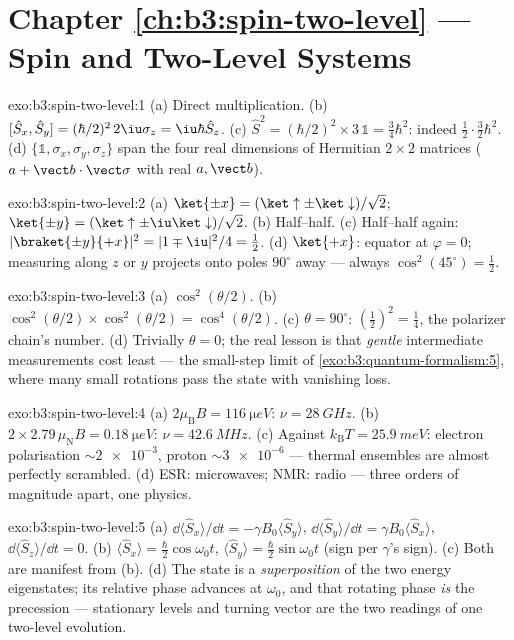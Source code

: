 \section*{Chapter \ref{ch:b3:spin-two-level} --- Spin and Two-Level Systems}

\begin{solution}{exo:b3:spin-two-level:1}
(a) Direct multiplication. (b) $[\hat S_x, \hat S_y] =
(\hbar/2)^2\,2\iu\sigma_z = \iu\hbar\hat S_z$. (c) $\hat S^2 =
(\hbar/2)^2 \times 3\,\mathbb 1 = \tfrac34\hbar^2$: indeed
$\tfrac12\cdot\tfrac32\hbar^2$. (d) $\{\mathbb 1, \sigma_x,
\sigma_y, \sigma_z\}$ span the four real dimensions of Hermitian
$2\times2$ matrices ($a + \vect b\cdot\vect\sigma$ with real $a,
\vect b$).
\end{solution}

\begin{solution}{exo:b3:spin-two-level:2}
(a) $\ket{\pm x} = (\ket\uparrow \pm \ket\downarrow)/\sqrt2$;
$\ket{\pm y} = (\ket\uparrow \pm \iu\ket\downarrow)/\sqrt2$. (b)
Half--half. (c) Half--half again: $|\braket{\pm y}{+x}|^2 =
|1 \mp \iu|^2/4 = \tfrac12$. (d) $\ket{+x}$: equator at $\varphi =
0$; measuring along $z$ or $y$ projects onto poles $90^\circ$ away
--- always $\cos^2(45^\circ) = \tfrac12$.
\end{solution}

\begin{solution}{exo:b3:spin-two-level:3}
(a) $\cos^2(\theta/2)$. (b) $\cos^2(\theta/2) \times
\cos^2(\theta/2) = \cos^4(\theta/2)$. (c) $\theta = 90^\circ$:
$(\tfrac12)^2 = \tfrac14$, the polarizer chain's number. (d)
Trivially $\theta = 0$; the real lesson is that \emph{gentle}
intermediate measurements cost least --- the small-step limit of
\cref{exo:b3:quantum-formalism:5}, where many small rotations pass
the state with vanishing loss.
\end{solution}

\begin{solution}{exo:b3:spin-two-level:4}
(a) $2\mu_{\text{B}}B = \qty{116}{\micro eV}$: $\nu =
\qty{28}{GHz}$. (b) $2 \times 2.79\,\mu_{\text{N}}B =
\qty{0.18}{\micro eV}$: $\nu = \qty{42.6}{MHz}$. (c) Against
$k_{\text{B}}T = \qty{25.9}{meV}$: electron polarisation
$\sim\num{2e-3}$, proton $\sim\num{3e-6}$ --- thermal 
ensembles are almost perfectly scrambled. (d) ESR: microwaves;
NMR: radio --- three orders of magnitude apart, one physics.
\end{solution}

\begin{solution}{exo:b3:spin-two-level:5}
(a) $\dd\langle\hat S_x\rangle/\dd t = -\gamma B_0\langle\hat
S_y\rangle$, $\dd\langle\hat S_y\rangle/\dd t = \gamma
B_0\langle\hat S_x\rangle$, $\dd\langle\hat S_z\rangle/\dd t = 0$.
(b) $\langle\hat S_x\rangle = \tfrac\hbar2\cos\omega_0t$,
$\langle\hat S_y\rangle = \tfrac\hbar2\sin\omega_0t$ (sign per
$\gamma$'s sign). (c) Both are manifest from (b). (d) The state is
a \emph{superposition} of the two energy eigenstates; its relative
phase advances at $\omega_0$, and that rotating phase \emph{is} the
precession --- stationary levels and turning vector are the two
readings of one two-level evolution.
\end{solution}

